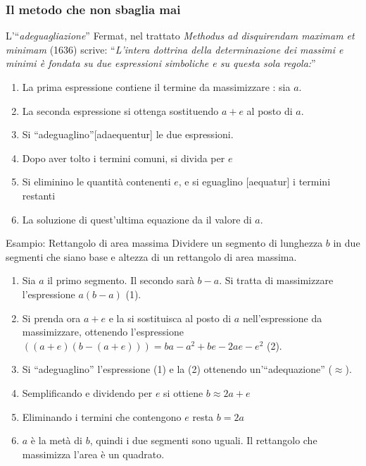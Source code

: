 \begin{frame}[label=Fermat-metodo]
    \frametitle{Il metodo che non sbaglia mai}
    \begin{block}{L'``\textit{adeguagliazione}''}
        Fermat, nel trattato \textit{Methodus ad disquirendam maximam et minimam} (1636) scrive:
        ``\textit{L'intera dottrina della determinazione dei massimi e minimi è
        fondata su due espressioni simboliche e su questa sola regola:}''
        \begin{enumerate}
        \item<1-> La prima espressione contiene il termine da massimizzare : sia $a$.
        \item<2-> La seconda espressione si ottenga sostituendo $a+e$ al posto di $a$.
        \item<3-> Si ``\alert{adeguaglino}''[adaequentur] le due espressioni.
        \item<4-> Dopo aver tolto i termini comuni, si divida per $e$
        \item<5-> Si eliminino le quantità contenenti $e$, e si eguaglino [aequatur] i termini restanti
        \item<6-> La soluzione di quest'ultima equazione da il valore di $a$.
        \end{enumerate}
    \end{block}
    \pause

    \begin{exampleblock}{Esampio: Rettangolo di area massima}
    Dividere un segmento di lunghezza $b$ in due segmenti che siano base e altezza 
    di un rettangolo di area massima.
    \begin{enumerate}
        \item Sia $a$ il primo segmento. Il secondo sarà $b-a$. Si tratta di massimizzare l'espressione $a(b-a)$ (1).
        \item Si prenda ora $a+e$ e la si sostituisca al posto di $a$ nell'espressione da massimizzare, ottenendo
    l'espressione $((a+e)(b-(a+e))) = ba - a^2 +be -2ae -e^2$ (2).
    \item Si ``\alert{adeguaglino}'' l'espressione (1) e la (2) ottenendo un'``\alert{adequazione}'' ($\approx$).
    \item Semplificando e dividendo per $e$ si ottiene $b \approx 2a + e$
    \item Eliminando i termini che contengono $e$ resta $b = 2a$ 
    \item $a$ è la metà di $b$, quindi i due segmenti sono uguali. Il rettangolo che massimizza l'area è un quadrato.    
    \end{enumerate}
    \end{exampleblock}    

\end{frame}